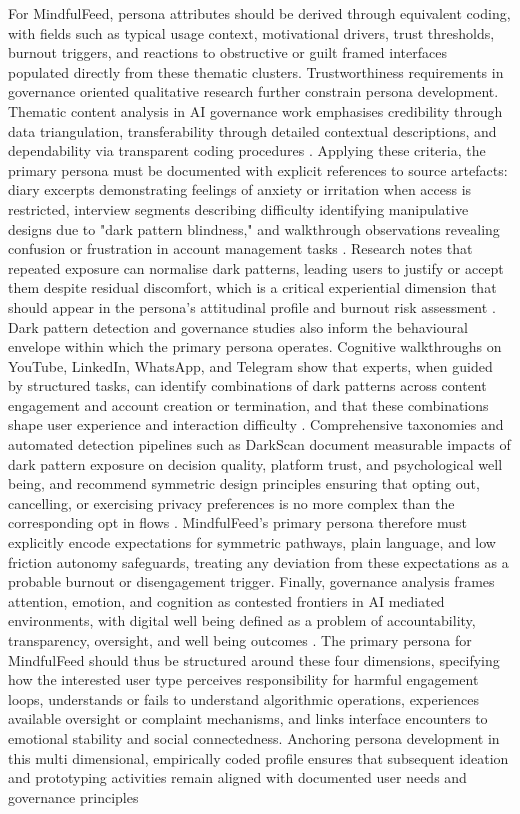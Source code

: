 \documentclass{article}
\begin{document}
For MindfulFeed, persona attributes should be derived through equivalent coding, with fields such as typical usage context, motivational drivers, trust thresholds, burnout triggers, and reactions to obstructive or guilt framed interfaces populated directly from these thematic clusters. Trustworthiness requirements in governance oriented qualitative research further constrain persona development. Thematic content analysis in AI governance work emphasises credibility through data triangulation, transferability through detailed contextual descriptions, and dependability via transparent coding procedures \parencites[8]{7808872}. Applying these criteria, the primary persona must be documented with explicit references to source artefacts: diary excerpts demonstrating feelings of anxiety or irritation when access is restricted, interview segments describing difficulty identifying manipulative designs due to "dark pattern blindness," and walkthrough observations revealing confusion or frustration in account management tasks \parencites[7173856][5]{7173856}. Research notes that repeated exposure can normalise dark patterns, leading users to justify or accept them despite residual discomfort, which is a critical experiential dimension that should appear in the persona's attitudinal profile and burnout risk assessment \parencites[7173856][5]{7173856}. Dark pattern detection and governance studies also inform the behavioural envelope within which the primary persona operates. Cognitive walkthroughs on YouTube, LinkedIn, WhatsApp, and Telegram show that experts, when guided by structured tasks, can identify combinations of dark patterns across content engagement and account creation or termination, and that these combinations shape user experience and interaction difficulty \parencites[3]{4692551}. Comprehensive taxonomies and automated detection pipelines such as DarkScan document measurable impacts of dark pattern exposure on decision quality, platform trust, and psychological well being, and recommend symmetric design principles ensuring that opting out, cancelling, or exercising privacy preferences is no more complex than the corresponding opt in flows \parencites[2]{4807303}[8]{4807303}. MindfulFeed's primary persona therefore must explicitly encode expectations for symmetric pathways, plain language, and low friction autonomy safeguards, treating any deviation from these expectations as a probable burnout or disengagement trigger. Finally, governance analysis frames attention, emotion, and cognition as contested frontiers in AI mediated environments, with digital well being defined as a problem of accountability, transparency, oversight, and well being outcomes \parencites[7808872][8]{7808872}. The primary persona for MindfulFeed should thus be structured around these four dimensions, specifying how the interested user type perceives responsibility for harmful engagement loops, understands or fails to understand algorithmic operations, experiences available oversight or complaint mechanisms, and links interface encounters to emotional stability and social connectedness. Anchoring persona development in this multi dimensional, empirically coded profile ensures that subsequent ideation and prototyping activities remain aligned with documented user needs and governance principles 
\end{document}
